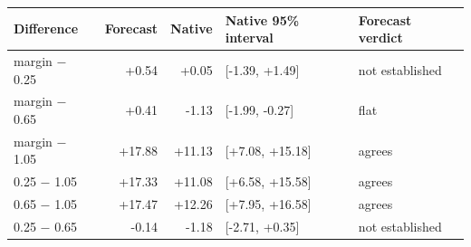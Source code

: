 \begin{tabular}{lrrll}
\toprule
Difference & Forecast & Native & Native 95\% interval & Forecast verdict \\
\midrule
margin $-$ 0.25 & +0.54 & +0.05 & [-1.39, +1.49] & not established \\
margin $-$ 0.65 & +0.41 & -1.13 & [-1.99, -0.27] & flat \\
margin $-$ 1.05 & +17.88 & +11.13 & [+7.08, +15.18] & agrees \\
0.25 $-$ 1.05 & +17.33 & +11.08 & [+6.58, +15.58] & agrees \\
0.65 $-$ 1.05 & +17.47 & +12.26 & [+7.95, +16.58] & agrees \\
0.25 $-$ 0.65 & -0.14 & -1.18 & [-2.71, +0.35] & not established \\
\bottomrule
\end{tabular}
